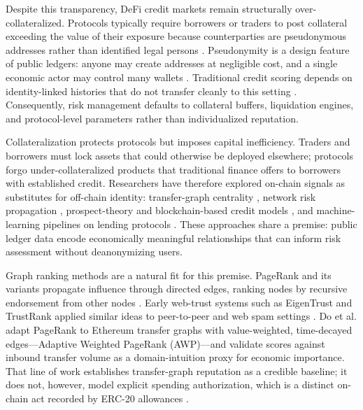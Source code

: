 Despite this transparency, DeFi credit markets remain structurally over-collateralized. Protocols typically require borrowers or traders to post collateral exceeding the value of their exposure because counterparties are pseudonymous addresses rather than identified legal persons . Pseudonymity is a design feature of public ledgers: anyone may create addresses at negligible cost, and a single economic actor may control many wallets . Traditional credit scoring depends on identity-linked histories that do not transfer cleanly to this setting . Consequently, risk management defaults to collateral buffers, liquidation engines, and protocol-level parameters rather than individualized reputation.

Collateralization protects protocols but imposes capital inefficiency. Traders and borrowers must lock assets that could otherwise be deployed elsewhere; protocols forgo under-collateralized products that traditional finance offers to borrowers with established credit. Researchers have therefore explored on-chain signals as substitutes for off-chain identity: transfer-graph centrality , network risk propagation , prospect-theory and blockchain-based credit models , and machine-learning pipelines on lending protocols . These approaches share a premise: public ledger data encode economically meaningful relationships that can inform risk assessment without deanonymizing users.

Graph ranking methods are a natural fit for this premise. PageRank and its variants propagate influence through directed edges, ranking nodes by recursive endorsement from other nodes . Early web-trust systems such as EigenTrust and TrustRank applied similar ideas to peer-to-peer and web spam settings . Do et al. adapt PageRank to Ethereum transfer graphs with value-weighted, time-decayed edges---Adaptive Weighted PageRank (AWP)---and validate scores against inbound transfer volume as a domain-intuition proxy for economic importance. That line of work establishes transfer-graph reputation as a credible baseline; it does not, however, model explicit spending authorization, which is a distinct on-chain act recorded by ERC-20 allowances .


